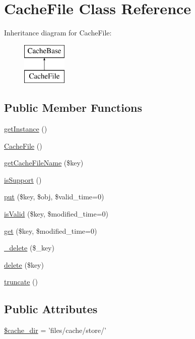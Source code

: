 \hypertarget{classCacheFile}{\section{Cache\-File Class Reference}
\label{classCacheFile}
}
Inheritance diagram for Cache\-File\-:\begin{figure}[H]
\begin{center}
\leavevmode
\includegraphics[height=2.000000cm]{classCacheFile}
\end{center}
\end{figure}
\subsection*{Public Member Functions}
\begin{DoxyCompactItemize}
\item 
\hyperlink{classCacheFile_a5389ea809c31aed387c12eb37b2677b8}{get\-Instance} ()
\item 
\hyperlink{classCacheFile_a989f8b586fb83812f1c0ab1e3f2e302a}{Cache\-File} ()
\item 
\hyperlink{classCacheFile_a15ca23dea98604dc2e6d067f9ce48242}{get\-Cache\-File\-Name} (\$key)
\item 
\hyperlink{classCacheFile_ab3982221be8af4a74302b648831d1376}{is\-Support} ()
\item 
\hyperlink{classCacheFile_a1883472236dececa9215546dae2733cc}{put} (\$key, \$obj, \$valid\-\_\-time=0)
\item 
\hyperlink{classCacheFile_ab154224d403ed4199885414cfa34d713}{is\-Valid} (\$key, \$modified\-\_\-time=0)
\item 
\hyperlink{classCacheFile_aa5834aeb4fce61fe5e99d06fe3795d84}{get} (\$key, \$modified\-\_\-time=0)
\item 
\hyperlink{classCacheFile_a59058fb815de83e25ec107fec5dff2d2}{\-\_\-delete} (\$\-\_\-key)
\item 
\hyperlink{classCacheFile_aae765f3dbe6d888b5e272c247f696518}{delete} (\$key)
\item 
\hyperlink{classCacheFile_a990fc76da2501ced9077aff881350f7f}{truncate} ()
\end{DoxyCompactItemize}
\subsection*{Public Attributes}
\begin{DoxyCompactItemize}
\item 
\hyperlink{classCacheFile_a39d0574a28dd55f6b312811f411f2f51}{\$cache\-\_\-dir} = 'files/cache/store/'
\end{DoxyCompactItemize}


